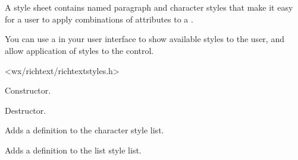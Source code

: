 \section{}\label{wxrichtextstylesheet}

A style sheet contains named paragraph and character styles that make it
easy for a user to apply combinations of attributes to a .

You can use a  in your
user interface to show available styles to the user, and allow application
of styles to the control.




<wx/richtext/richtextstyles.h>



\label{wxrichtextstylesheetwxrichtextstylesheet}


Constructor.

\label{wxrichtextstylesheetdtor}


Destructor.

\label{wxrichtextstylesheetaddcharacterstyle}


Adds a definition to the character style list.

\label{wxrichtextstylesheetaddliststyle}


Adds a definition to the list style list.

\label{wxrichtextstylesheetaddparagraphstyle}


